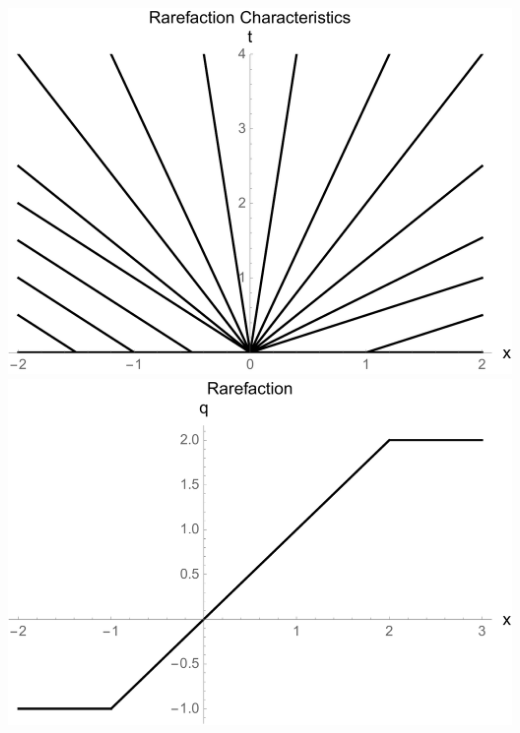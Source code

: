 \documentclass[10pt]{beamer}
\begin{document}
\begin{frame}
\begin{itemize}
\begin{center}
            \includegraphics[scale=0.13]{Figures/RarefactionCharacteristics.pdf}
            \includegraphics[scale=0.13]{Figures/Rarefaction.pdf}
          \end{center}
      \end{itemize}
    \end{frame}
\end{document}
